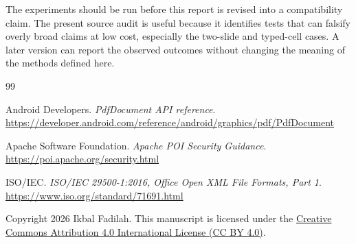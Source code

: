 \documentclass[10pt,letterpaper]{article}
\begin{document}
The experiments should be run before this report is revised into a compatibility claim. The present source audit is useful because it identifies tests that can falsify overly broad claims at low cost, especially the two-slide and typed-cell cases. A later version can report the observed outcomes without changing the meaning of the methods defined here.

\begin{thebibliography}{99}

 Android Developers. \emph{PdfDocument API reference}. \url{https://developer.android.com/reference/android/graphics/pdf/PdfDocument}

 Apache Software Foundation. \emph{Apache POI Security Guidance}. \url{https://poi.apache.org/security.html}

 ISO/IEC. \emph{ISO/IEC 29500-1:2016, Office Open XML File Formats, Part 1}. \url{https://www.iso.org/standard/71691.html}

\end{thebibliography}

\noindent\footnotesize Copyright 2026 Ikbal Fadilah. This manuscript is licensed under the \href{https://creativecommons.org/licenses/by/4.0/}{Creative Commons Attribution 4.0 International License (CC BY 4.0)}.
\end{document}
